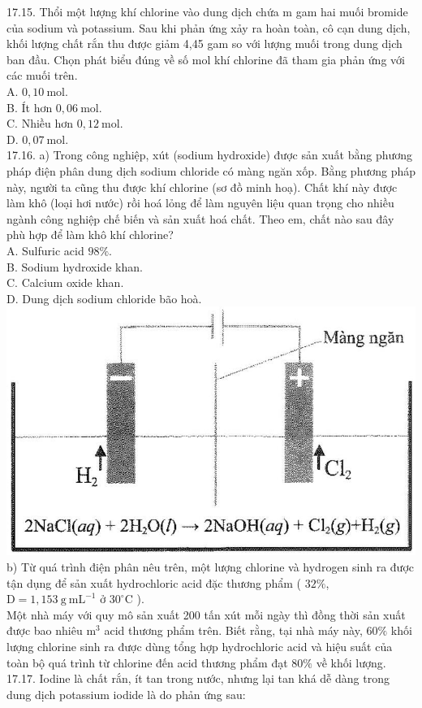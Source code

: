 \documentclass[10pt]{article}
\begin{document}
\begin{enumerate}
17.15. Thổi một lượng khí chlorine vào dung dịch chứa m gam hai muối bromide của sodium và potassium. Sau khi phản ứng xảy ra hoàn toàn, cô cạn dung dịch, khối lượng chất rắn thu được giảm 4,45 gam so với lượng muối trong dung dịch ban đầu. Chọn phát biểu đúng về số mol khí chlorine đã tham gia phản ứng với các muối trên.\\
A. $0,10 \mathrm{~mol}$.\\
B. Ít hơn $0,06 \mathrm{~mol}$.\\
C. Nhiều hơn $0,12 \mathrm{~mol}$.\\
D. $0,07 \mathrm{~mol}$.\\
17.16. a) Trong công nghiệp, xút (sodium hydroxide) được sản xuất bằng phương pháp điện phân dung dịch sodium chloride có màng ngăn xốp. Bằng phương pháp này, người ta cũng thu được khí chlorine (sơ đồ minh hoạ). Chất khí này được làm khô (loại hơi nước) rồi hoá lỏng để làm nguyên liệu quan trọng cho nhiều ngành công nghiệp chế biến và sản xuất hoá chất. Theo em, chất nào sau đây phù hợp để làm khô khí chlorine?\\
A. Sulfuric acid $98 \%$.\\
B. Sodium hydroxide khan.\\
C. Calcium oxide khan.\\
D. Dung dịch sodium chloride bão hoà.\\
\includegraphics[max width=\textwidth, center]{2025_10_23_76620c17ffac1ae9b35bg-58}\\
b) Từ quá trình điện phân nêu trên, một lượng chlorine và hydrogen sinh ra được tận dụng để sản xuất hydrochloric acid đặc thương phẩm ( $32 \%$, $\mathrm{D}=1,153 \mathrm{~g} \mathrm{~mL}^{-1}$ ở $30^{\circ} \mathrm{C}$ ).\\
Một nhà máy với quy mô sản xuất 200 tấn xút mỗi ngày thì đồng thời sản xuất được bao nhiêu $\mathrm{m}^{3}$ acid thương phẩm trên. Biết rằng, tại nhà máy này, $60 \%$ khối lượng chlorine sinh ra được dùng tổng hợp hydrochloric acid và hiệu suất của toàn bộ quá trình từ chlorine đến acid thương phẩm đạt $80 \%$ về khối lượng.\\
17.17. Iodine là chất rắn, ít tan trong nước, nhưng lại tan khá dễ dàng trong dung dịch potassium iodide là do phản ứng sau:
\end{enumerate}
\end{document}
